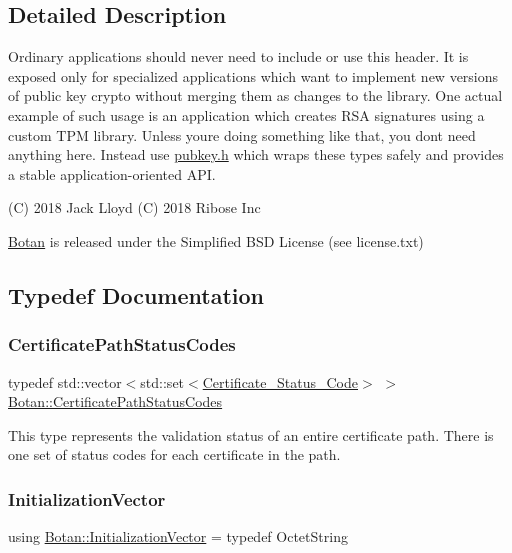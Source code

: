 \subsection{Detailed Description}
Ordinary applications should never need to include or use this header. It is exposed only for specialized applications which want to implement new versions of public key crypto without merging them as changes to the library. One actual example of such usage is an application which creates R\+SA signatures using a custom T\+PM library. Unless you\textquotesingle{}re doing something like that, you don\textquotesingle{}t need anything here. Instead use \hyperlink{pubkey_8h_source}{pubkey.\+h} which wraps these types safely and provides a stable application-\/oriented A\+PI.

(C) 2018 Jack Lloyd (C) 2018 Ribose Inc

\hyperlink{namespace_botan}{Botan} is released under the Simplified B\+SD License (see license.\+txt) 

\subsection{Typedef Documentation}
\mbox{\label{namespace_botan_a013252aabcb201e0d27b60b1e690886b}} 
\subsubsection{\texorpdfstring{Certificate\+Path\+Status\+Codes}{CertificatePathStatusCodes}}
{\footnotesize\ttfamily typedef std\+::vector$<$std\+::set$<$\hyperlink{namespace_botan_ae1e907dc90937bdda30f65216e68ff2b}{Certificate\+\_\+\+Status\+\_\+\+Code}$>$ $>$ \hyperlink{namespace_botan_a013252aabcb201e0d27b60b1e690886b}{Botan\+::\+Certificate\+Path\+Status\+Codes}}

This type represents the validation status of an entire certificate path. There is one set of status codes for each certificate in the path. \mbox{\label{namespace_botan_a2fbf5195ffe701adcabb1f8c41bfc557}} 
\subsubsection{\texorpdfstring{Initialization\+Vector}{InitializationVector}}
{\footnotesize\ttfamily using \hyperlink{namespace_botan_a2fbf5195ffe701adcabb1f8c41bfc557}{Botan\+::\+Initialization\+Vector} = typedef Octet\+String}

